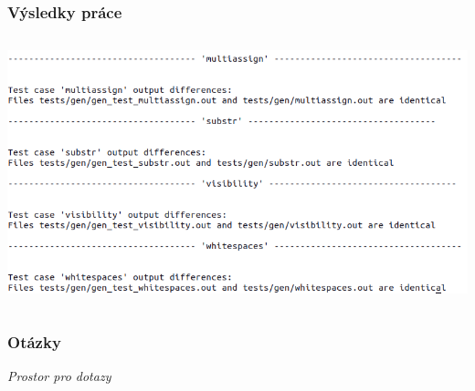 
\begin{frame}
  \frametitle{Výsledky práce}
  \begin{columns}
    \includegraphics[width=\textwidth]{img/tests2.pdf}
  \end{columns}
\end{frame}


\appendix{}
\begin{frame}
  \frametitle{Otázky}
  \begin{center}
    \Large{\emph{Prostor pro dotazy}}
  \end{center}
\end{frame}